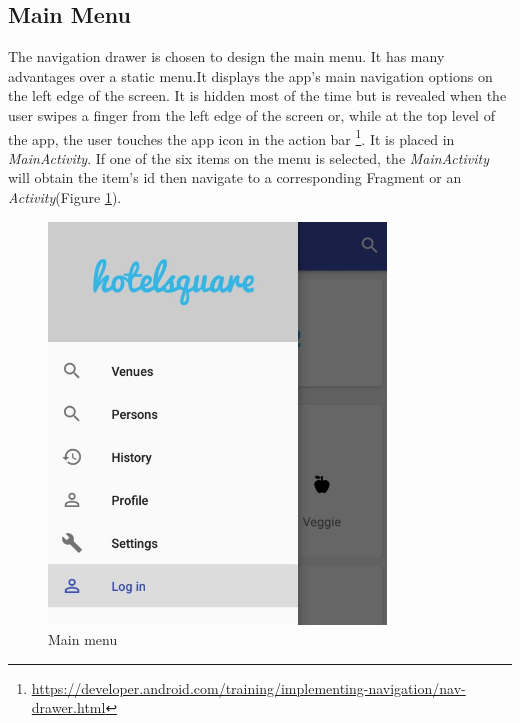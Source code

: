 \subsection{Main Menu}
The navigation drawer is chosen to design the main menu. It has many advantages over a static menu.It displays the app’s main navigation options on the left edge of the screen. It is hidden most of the time but is revealed when the user swipes a finger from the left edge of the screen or, while at the top level of the app, the user touches the app icon in the action bar \footnote{\url{https://developer.android.com/training/implementing-navigation/nav-drawer.html}}.
It is placed in \textit{MainActivity}. If one of the six items on the menu is selected, the \textit{MainActivity} will obtain the item's id then navigate to a corresponding Fragment or an \textit{Activity}(Figure \ref{fig:main_menu}).
\begin{figure}[htbp]
	\includegraphics[width=0.8\textwidth]{images/main_navigation.jpg}
	\centering
	\caption{Main menu}\label{fig:main_menu}
\end{figure}
